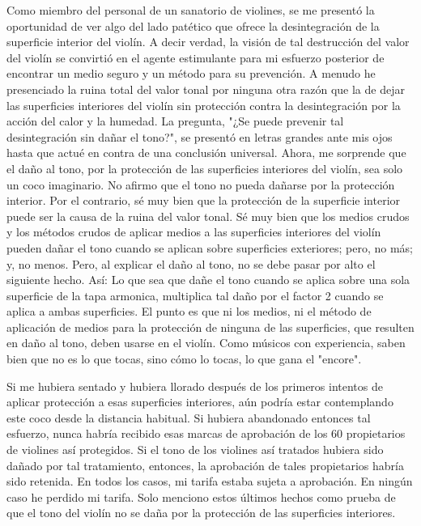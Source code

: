 \documentclass[12pt]{book}
\begin{document}
Como miembro del personal de un sanatorio de violines, se me presentó la oportunidad de ver algo del lado patético que ofrece la desintegración de la superficie interior del violín. A decir verdad, la visión de tal destrucción del valor del violín se convirtió en el agente estimulante para mi esfuerzo posterior de encontrar un medio seguro y un método para su prevención. A menudo he presenciado la ruina total del valor tonal por ninguna otra razón que la de dejar las superficies interiores del violín sin protección contra la desintegración por la acción del calor y la humedad. La pregunta, "¿Se puede prevenir tal desintegración sin dañar el tono?", se presentó en letras grandes ante mis ojos hasta que actué en contra de una conclusión universal. Ahora, me sorprende que el daño al tono, por la protección de las superficies interiores del violín, sea solo un coco imaginario. No afirmo que el tono no pueda dañarse por la protección interior. Por el contrario, sé muy bien que la protección de la superficie interior puede ser la causa de la ruina del valor tonal. Sé muy bien que los medios crudos y los métodos crudos de aplicar medios a las superficies interiores del violín pueden dañar el tono cuando se aplican sobre superficies exteriores; pero, no más; y, no menos. Pero, al explicar el daño al tono, no se debe pasar por alto el siguiente hecho. Así: Lo que sea que dañe el tono cuando se aplica sobre una sola superficie de la tapa armonica, multiplica tal daño por el factor 2 cuando se aplica a ambas superficies. El punto es que ni los medios, ni el método de aplicación de medios para la protección de ninguna de las superficies, que resulten en daño al tono, deben usarse en el violín. Como músicos con experiencia, saben bien que no es lo que tocas, sino cómo lo tocas, lo que gana el "encore".

Si me hubiera sentado y hubiera llorado después de los primeros intentos de aplicar protección a esas superficies interiores, aún podría estar contemplando este coco desde la distancia habitual. Si hubiera abandonado entonces tal esfuerzo, nunca habría recibido esas marcas de aprobación de los 60 propietarios de violines así protegidos. Si el tono de los violines así tratados hubiera sido dañado por tal tratamiento, entonces, la aprobación de tales propietarios habría sido retenida. En todos los casos, mi tarifa estaba sujeta a aprobación. En ningún caso he perdido mi tarifa. Solo menciono estos últimos hechos como prueba de que el tono del violín no se daña por la protección de las superficies interiores.
\end{document}
